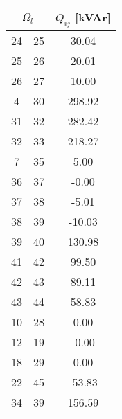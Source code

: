 \begin{table}[H]
\begin{minipage}{.5\linewidth}
\begin{tabular}{|c|c|c|}
        \end{tabular}
    \end{minipage}%
    \begin{minipage}{.5\linewidth}
        \centering
        \begin{tabular}{|c|c|c|}
            \hline
            \multicolumn{2}{|c|}{$\Omega_l$} & $Q_{ij}$ [kVAr]  \\ 
            \hline
            24 &  25 &   30.04\\ \hline
            25 &  26 &   20.01\\ \hline
            26 &  27 &   10.00\\ \hline
             4 &  30 &  298.92\\ \hline
            31 &  32 &  282.42\\ \hline
            32 &  33 &  218.27\\ \hline
             7 &  35 &    5.00\\ \hline
            36 &  37 &   -0.00\\ \hline
            37 &  38 &   -5.01\\ \hline
            38 &  39 &  -10.03\\ \hline
            39 &  40 &  130.98\\ \hline
            41 &  42 &   99.50\\ \hline
            42 &  43 &   89.11\\ \hline
            43 &  44 &   58.83\\ \hline
            10 &  28 &    0.00\\ \hline
            12 &  19 &   -0.00\\ \hline
            18 &  29 &    0.00\\ \hline
            22 &  45 &  -53.83\\ \hline
            34 &  39 &  156.59\\ \hline
        \end{tabular}
    \end{minipage} 
\end{table}


  
